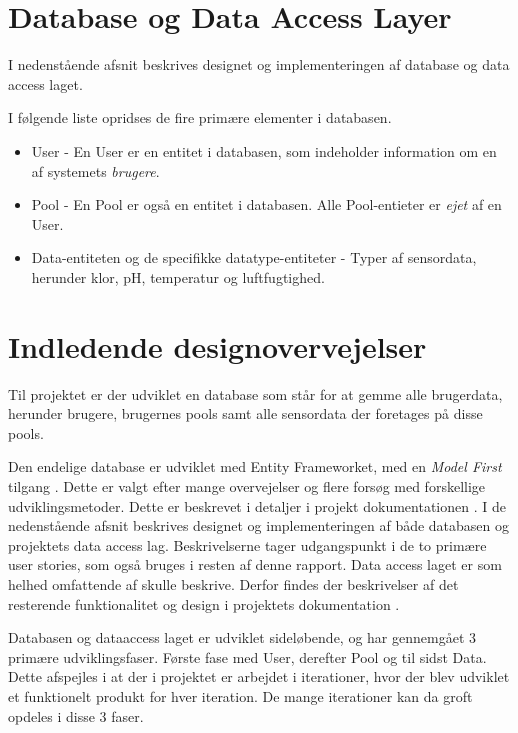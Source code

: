 \section{Database og Data Access Layer}\label{sec:designdatabase}

I nedenstående afsnit beskrives designet og implementeringen af database og data access laget.

I følgende liste opridses de fire primære elementer i databasen.

\begin{itemize}
	\item User - En User er en entitet i databasen, som indeholder information om en af systemets \textit{brugere}.
	\item Pool - En Pool er også en entitet i databasen. Alle Pool-entieter er \textit{ejet} af en User.
	\item Data-entiteten og de specifikke datatype-entiteter - Typer af sensordata, herunder klor, pH, temperatur og luftfugtighed.
\end{itemize}

\section{Indledende designovervejelser}\label{sec:designdatabase}

Til projektet er der udviklet en database som står for at gemme alle brugerdata, herunder brugere, brugernes pools samt alle sensordata der foretages på disse pools.

Den endelige database er udviklet med Entity Frameworket, med en \textit{Model First} tilgang . Dette er valgt efter mange overvejelser og flere forsøg med forskellige udviklingsmetoder. Dette er beskrevet i detaljer i projekt dokumentationen . I de nedenstående afsnit beskrives designet og implementeringen af både databasen og projektets data access lag. Beskrivelserne tager udgangspunkt i de to primære user stories, som også bruges i resten af denne rapport. Data access laget er som helhed omfattende af skulle beskrive. Derfor findes der beskrivelser af det resterende funktionalitet og design i projektets dokumentation .

Databasen og dataaccess laget er udviklet sideløbende, og har gennemgået 3 primære udviklingsfaser. Første fase med User, derefter Pool og til sidst Data. Dette afspejles i at der i projektet er arbejdet i iterationer, hvor der blev udviklet et funktionelt produkt for hver iteration. De mange iterationer kan da groft opdeles i disse 3 faser.

